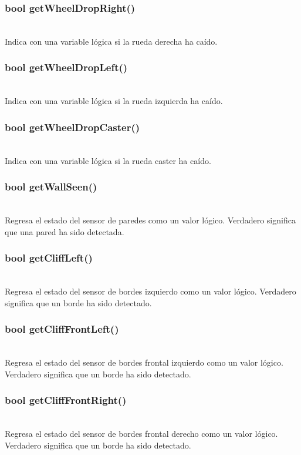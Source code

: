 \documentclass[letterpaper]{book}
\begin{document}
\subsubsection{bool getWheelDropRight()}\mbox{}\\
Indica con una variable lógica si la rueda derecha ha caído.\\
\subsubsection{	bool getWheelDropLeft()}\mbox{}\\
Indica con una variable lógica si la rueda izquierda ha caído.\\
\subsubsection{bool getWheelDropCaster()}\mbox{}\\
Indica con una variable lógica si la rueda caster ha caído.\\
\subsubsection{bool getWallSeen()}\mbox{}\\
Regresa el estado del sensor de paredes como un valor lógico. Verdadero significa que una pared ha sido detectada.\\
\subsubsection{bool getCliffLeft()}\mbox{}\\
Regresa el estado del sensor de bordes izquierdo como un valor lógico. Verdadero significa que un borde ha sido detectado.\\
\subsubsection{bool getCliffFrontLeft()}\mbox{}\\
Regresa el estado del sensor de bordes frontal izquierdo como un valor lógico. Verdadero significa que un borde ha sido detectado.\\
\subsubsection{bool getCliffFrontRight()}\mbox{}\\
Regresa el estado del sensor de bordes frontal derecho como un valor lógico. Verdadero significa que un borde ha sido detectado.\\
\end{document}
